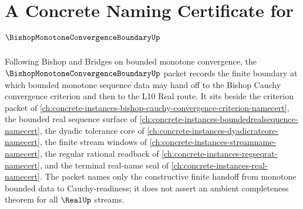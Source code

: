 \chapter{A Concrete Naming Certificate for $\BishopMonotoneConvergenceBoundaryUp$}
\label{ch:concrete-instances-bishop-monotone-convergence-boundary-namecert}

Following Bishop and Bridges on bounded monotone convergence, the $\BishopMonotoneConvergenceBoundaryUp$ packet records the finite boundary at which bounded monotone sequence data may hand off to the Bishop Cauchy convergence criterion and then to the L10 Real route. It sits beside the criterion packet of \autoref{ch:concrete-instances-bishop-cauchy-convergence-criterion-namecert}, the bounded real sequence surface of \autoref{ch:concrete-instances-boundedrealsequence-namecert}, the dyadic tolerance core of \autoref{ch:concrete-instances-dyadicratcore-namecert}, the finite stream windows of \autoref{ch:concrete-instances-streamname-namecert}, the regular rational readback of \autoref{ch:concrete-instances-regseqrat-namecert}, and the terminal real-name seal of \autoref{ch:concrete-instances-real-namecert}. The packet names only the constructive finite handoff from monotone bounded data to Cauchy-readiness; it does not assert an ambient completeness theorem for all $\RealUp$ streams.

